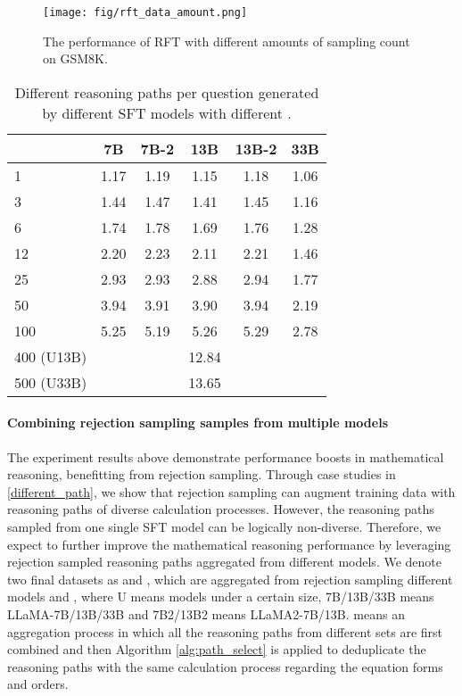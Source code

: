 \documentclass{article} \usepackage{iclr2021_conference,times}
\begin{document}
\begin{figure}[t]
    \centering
    \texttt{[image: fig/rft\_data\_amount.png]}
    \caption{The performance of RFT with different amounts of sampling count  on GSM8K.}
    \label{fig:rft_data_amount}
\end{figure}

\begin{table}[t]
    \small
    \centering
    \begin{tabular}{l|ccccc}
  \hline
   & 7B & 7B-2 & 13B & 13B-2 & 33B\\
  \hline
  1 & 1.17 & 1.19 & 1.15 & 1.18 & 1.06  \\
  3 & 1.44 & 1.47 & 1.41 & 1.45 & 1.16  \\
  6 & 1.74 & 1.78 & 1.69 & 1.76 & 1.28 \\
  12 & 2.20 & 2.23 & 2.11 & 2.21 & 1.46 \\
  25 & 2.93 & 2.93 & 2.88 & 2.94 & 1.77 \\
  50 & 3.94 & 3.91 & 3.90 & 3.94 & 2.19\\
  100 & 5.25 & 5.19 & 5.26 & 5.29 & 2.78 \\
  \hline
  400 (U13B) & &&12.84 \\
  500 (U33B) & &&13.65 \\
  \hline
    \end{tabular}
    \caption{Different reasoning paths per question generated by different SFT models with different .}
    \label{tab:rft_k_different_path}
\end{table}



\paragraph{Combining rejection sampling samples from multiple models} 

The experiment results above demonstrate performance boosts in mathematical reasoning, benefitting from rejection sampling. Through case studies in \ref{different_path}, we show that rejection sampling can augment training data with reasoning paths of diverse calculation processes. 
However, the reasoning paths sampled from one single SFT model can be logically non-diverse. 
Therefore, we expect to further improve the mathematical reasoning performance by leveraging rejection sampled reasoning paths aggregated from different models. 
We denote two final datasets as  and , which are aggregated from rejection sampling different models  and , where U means models under a certain size, 7B/13B/33B means LLaMA-7B/13B/33B and 7B2/13B2 means LLaMA2-7B/13B.  means an aggregation process in which all the reasoning paths from different sets are first combined and then Algorithm \ref{alg:path_select} is applied to deduplicate the reasoning paths with the same calculation process regarding the equation forms and orders.
\end{document}
